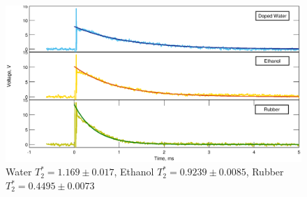 \begin{figure}[H]
\centering
\includegraphics[width=\textwidth]{figures/B2/B2_1.eps}
\caption{Water $T_2^* = 1.169 \pm 0.017$, Ethanol $T_2^* = 0.9239 \pm 0.0085$, Rubber $T_2^* = 0.4495 \pm 0.0073$ }
\label{fig:B2:T2samples}
\end{figure}




